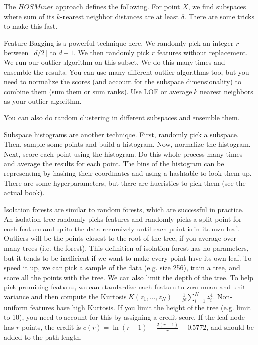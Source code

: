 \documentclass[a4paper]{article}
\begin{document}
The $HOS Miner$ approach defines the following. For point $X$, we find subspaces
where sum of its $k$-nearest neighbor distances are at least $\delta$. There
are some tricks to make this fast.

Feature Bagging is a powerful technique here. We randomly pick an integer $r$
between $\lfloor d/2 \rfloor$ to $d - 1$. We then randomly pick $r$ features
without replacement. We run our outlier algorithm on this subset. We do this
many times and ensemble the results. You can use many different outlier
algorithms too, but you need to normalize the scores (and account for the
subspace dimensionality) to combine them (sum them or sum ranks). Use LOF or
average $k$ nearest neighbors as your outlier algorithm.

You can also do random clustering in different subspaces and ensemble them.

Subspace histograms are another technique. First, randomly pick a subspace.
Then, sample some points and build a histogram. Now, normalize the histogram.
Next, score each point using the histogram. Do this whole process many times
and average the results for each point. The bins of the histogram can
be representing by hashing their coordinates and using a hashtable to look
them up. There are some hyperparameters, but there are hueristics to pick them
(see the actual book).

Isolation forests are similar to random forests, which are successful in
practice. An isolation tree randomly picks features and randomly picks a split
point for each feature and splits the data recursively until each point is
in its own leaf. Outliers will be the points closest to the root of the tree,
if you average over many trees (i.e. the forest). This definition of isolation
forest has no parameters, but it tends to be inefficient if we want to make
every point have its own leaf. To speed it up, we can pick a sample of the data
(e.g. size 256), train a tree, and score all the points with the tree. We can
also limit the depth of the tree. To help pick promising features, we can
standardize each feature to zero mean and unit variance and then compute
the Kurtosis $K(z_1, ..., z_N) = \frac{1}{N}\sum_{i=1}^{N}{z_i^4}$. Non-uniform
features have high Kurtosis. If you limit the height of the tree (e.g. limit to
10), you need to account for this by assigning a credit score. If the leaf node
has $r$ points, the credit is $c(r) = \ln(r - 1) - \frac{2(r-1)}{r} + 0.5772$,
and should be added to the path length.
\end{document}
